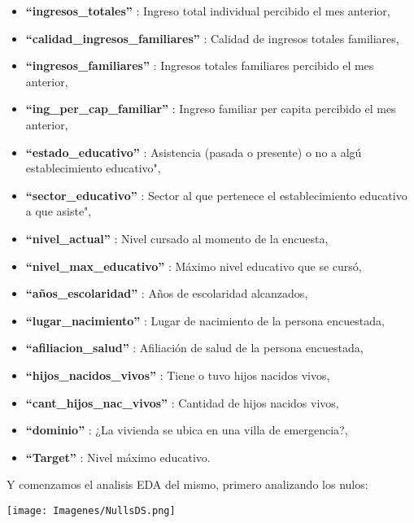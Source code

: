 \documentclass[a4paper]{article}
\begin{document}
\begin{itemize}
        \item \textbf{``ingresos\_totales''}             : Ingreso total individual percibido el mes anterior,
        \item \textbf{``calidad\_ingresos\_familiares''} : Calidad de ingresos totales familiares,
        \item \textbf{``ingresos\_familiares''}          : Ingresos totales familiares percibido el mes anterior,
        \item \textbf{``ing\_per\_cap\_familiar''}       : Ingreso familiar per capita percibido el mes anterior,
        \item \textbf{``estado\_educativo''}             : Asistencia (pasada o presente) o no a algú establecimiento educativo",
        \item \textbf{``sector\_educativo''}             : Sector al que pertenece el establecimiento educativo a que asiste",
        \item \textbf{``nivel\_actual''}                 : Nivel cursado al momento de la encuesta,
        \item \textbf{``nivel\_max\_educativo''}         : Máximo nivel educativo que se cursó,
        \item \textbf{``años\_escolaridad''}             : Años de escolaridad alcanzados,
        \item \textbf{``lugar\_nacimiento''}             : Lugar de nacimiento de la persona encuestada,
        \item \textbf{``afiliacion\_salud''}             : Afiliación de salud de la persona encuestada,
        \item \textbf{``hijos\_nacidos\_vivos''}         : Tiene o tuvo hijos nacidos vivos,
        \item \textbf{``cant\_hijos\_nac\_vivos''}       : Cantidad de hijos nacidos vivos,
        \item \textbf{``dominio''}                       : ¿La vivienda se ubica en una villa de emergencia?,
        \item \textbf{``Target''}                        : Nivel máximo educativo.
    \end{itemize}
 
    \newpage

    Y comenzamos el analisis EDA del mismo, primero analizando los nulos:

    \begin{center}
        \texttt{[image: Imagenes/NullsDS.png]}
    \end{center}
 
\end{document}

